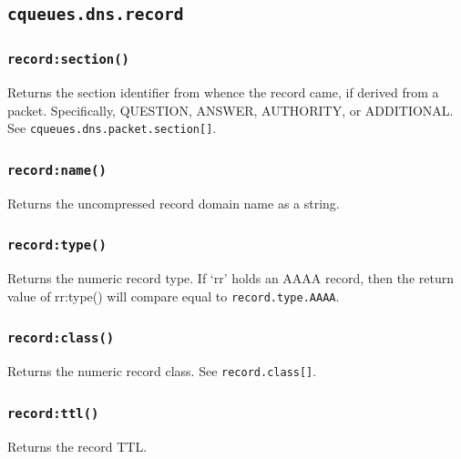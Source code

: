 \documentclass[11pt, oneside]{memoir}
\newcommand*{\fn}[1]{\texttt{#1}\xspace}
\newcommand*{\module}[1]{\texttt{#1}\xspace}
\newcounter{toccols}
\newenvironment{Module}[1]{
	\subsection{\texttt{#1}}
	\addtocontents{toc}{
		\protect\begin{multicols}{\value{toccols}}
	}
}{
	\addtocontents{toc}{\protect\end{multicols}}
}
\begin{document}
\begin{Module}{cqueues.dns.record}
\subsubsection[\fn{record:section}]{\fn{record:section()}}

Returns the section identifier from whence the record came, if derived from a packet. Specifically, QUESTION, ANSWER, AUTHORITY, or ADDITIONAL. See \module{cqueues.dns.packet.section[]}.

\subsubsection[\fn{record:name}]{\fn{record:name()}}

Returns the uncompressed record domain name as a string.

\subsubsection[\fn{record:type}]{\fn{record:type()}}

Returns the numeric record type. If `rr' holds an AAAA record, then the return value of rr:type() will compare equal to \module{record.type.AAAA}.

\subsubsection[\fn{record:class}]{\fn{record:class()}}

Returns the numeric record class. See \module{record.class[]}.

\subsubsection[\fn{record:ttl}]{\fn{record:ttl()}}

Returns the record TTL.

\end{Module}
\end{document}
